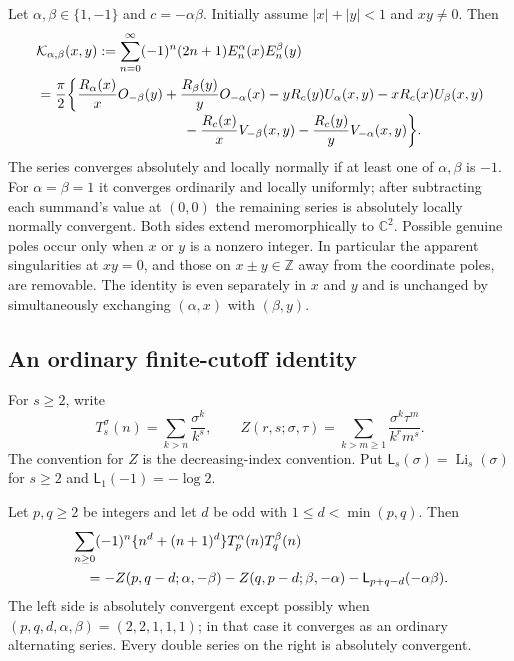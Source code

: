\begin{theorem}
\label{alt:thm:master}
Let $\alpha,\beta\in\{1,-1\}$ and $c=-\alpha\beta$. Initially assume
$|x|+|y|<1$ and $xy\ne0$. Then
\begin{align}
 &\mathcal K_{\alpha,\beta}(x,y)
 :=\sum_{n=0}^\infty(-1)^n(2n+1)E_n^\alpha(x)E_n^\beta(y)
 \notag\\
 &=\frac\pi2\bigg\{
 \frac{R_\alpha(x)}xO_{-\beta}(y)
 +\frac{R_\beta(y)}yO_{-\alpha}(x)
 -yR_c(y)U_\alpha(x,y)-xR_c(x)U_\beta(x,y)
 \notag\\[-2pt]
 &\hspace{37mm}
 -\frac{R_c(x)}xV_{-\beta}(x,y)
 -\frac{R_c(y)}yV_{-\alpha}(x,y)\bigg\}.
 \label{alt:eq:master}
\end{align}
The series converges absolutely and locally normally if at least one of
$\alpha,\beta$ is $-1$. For $\alpha=\beta=1$ it converges ordinarily
and locally uniformly; after subtracting each summand's value at
$(0,0)$ the remaining series is absolutely locally normally
convergent. Both sides extend meromorphically to $\mathbb C^2$.
Possible genuine poles occur only when $x$ or $y$ is a nonzero integer.
In particular the apparent singularities at $xy=0$, and those on
$x\pm y\in\mathbb Z$ away from the coordinate poles, are removable.
The identity is even separately in $x$ and $y$ and is unchanged by
simultaneously exchanging $(\alpha,x)$ with $(\beta,y)$.
\end{theorem}

\subsection{An ordinary finite-cutoff identity}

For $s\ge2$, write
\[
 T_s^\sigma(n)=\sum_{k>n}\frac{\sigma^k}{k^s},\qquad
 Z(r,s;\sigma,\tau)
 =\sum_{k>m\ge1}\frac{\sigma^k\tau^m}{k^r m^s}.
\]
The convention for $Z$ is the decreasing-index convention. Put
$\mathsf L_s(\sigma)=\operatorname{Li}_s(\sigma)$ for $s\ge2$ and
$\mathsf L_1(-1)=-\log2$.

\begin{lemma}
\label{alt:lem:finitecutoff}
Let $p,q\ge2$ be integers and let $d$ be odd with
$1\le d<\min(p,q)$. Then
\begin{align}
 &\sum_{n\ge0}(-1)^n\{n^d+(n+1)^d\}
                    T_p^\alpha(n)T_q^\beta(n)\notag\\
 &\quad=-Z(p,q-d;\alpha,-\beta)
        -Z(q,p-d;\beta,-\alpha)
        -\mathsf L_{p+q-d}(-\alpha\beta).
 \label{alt:eq:weighted-tail}
\end{align}
The left side is absolutely convergent except possibly when
$(p,q,d,\alpha,\beta)=(2,2,1,1,1)$; in that case it converges as
an ordinary alternating series. Every double series on the right is
absolutely convergent.
\end{lemma}

